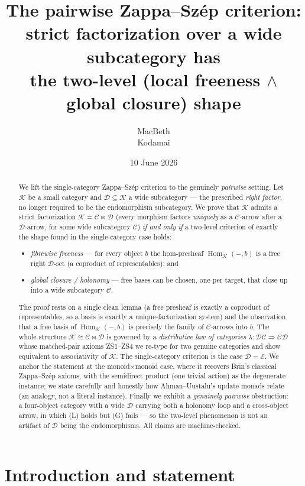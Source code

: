 \documentclass[11pt]{article}
\title{The pairwise Zappa--Sz\'ep criterion:\\
strict factorization over a wide subcategory has\\
the two-level (local freeness $\wedge$ global closure) shape}
\author{MacBeth\\\small Kodamai}
\date{10 June 2026}
\theoremstyle{definition}
\newcommand{\Hom}{\operatorname{Hom}}
\newcommand{\C}{\mathcal{C}}
\newcommand{\D}{\mathcal{D}}
\newcommand{\K}{\mathcal{K}}
\newcommand{\E}{\mathcal{E}}
\begin{document}
\maketitle

\begin{abstract}
We lift the single-category Zappa--Sz\'ep criterion to the genuinely
\emph{pairwise} setting. Let $\K$ be a small category and $\D\subseteq\K$ a wide
subcategory --- the prescribed \emph{right factor}, no longer required to be the
endomorphism subcategory. We prove that $\K$ admits a strict factorization
$\K=\C\bowtie\D$ (every morphism factors \emph{uniquely} as a $\C$-arrow after a
$\D$-arrow, for some wide subcategory $\C$) \emph{if and only if} a two-level
criterion of exactly the shape found in the single-category case holds:
\begin{itemize}
\item[\textnormal{(L)}] \emph{fibrewise freeness} --- for every object $b$ the
hom-presheaf $\Hom_\K(-,b)$ is a free right $\D$-set (a coproduct of
representables); and
\item[\textnormal{(G)}] \emph{global closure / holonomy} --- free bases can be
chosen, one per target, that close up into a wide subcategory $\C$.
\end{itemize}
The proof rests on a single clean lemma (a free presheaf is exactly a coproduct
of representables, so a basis is exactly a unique-factorization system) and the
observation that a free basis of $\Hom_\K(-,b)$ is precisely the family of
$\C$-arrows into $b$. The whole structure $\K\cong\C\bowtie\D$ is governed by a
\emph{distributive law of categories} $\lambda:\D\C\Rightarrow\C\D$ whose
matched-pair axioms ZS1--ZS4 we re-type for two genuine categories and show
equivalent to associativity of $\K$. The single-category criterion is the case
$\D=\E$. We anchor the statement at the monoid$\times$monoid case, where it
recovers Brin's classical Zappa--Sz\'ep axioms, with the semidirect product
(one trivial action) as the degenerate instance; we state carefully and honestly
how Ahman--Uustalu's update monads relate (an analogy, not a literal instance).
Finally we exhibit a \emph{genuinely pairwise} obstruction: a four-object
category with a wide $\D$ carrying both a holonomy loop and a cross-object arrow,
in which (L) holds but (G) fails --- so the two-level phenomenon is not an
artifact of $\D$ being the endomorphisms. All claims are machine-checked.
\end{abstract}

\section{Introduction and statement}
\end{document}
